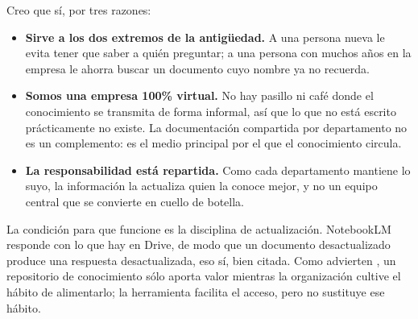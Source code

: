 \documentclass[11pt,letterpaper]{article}
\begin{document}
Creo que sí, por tres razones:

\begin{itemize}[leftmargin=1.2em, itemsep=0.25em]
  \item \textbf{Sirve a los dos extremos de la antigüedad.} A una persona nueva
    le evita tener que saber a quién preguntar; a una persona con muchos años
    en la empresa le ahorra buscar un documento cuyo nombre ya no recuerda.
  \item \textbf{Somos una empresa 100\% virtual.} No hay pasillo ni café donde
    el conocimiento se transmita de forma informal, así que lo que no está
    escrito prácticamente no existe. La documentación compartida por
    departamento no es un complemento: es el medio principal por el que el
    conocimiento circula.
  \item \textbf{La responsabilidad está repartida.} Como cada departamento
    mantiene lo suyo, la información la actualiza quien la conoce mejor, y no
    un equipo central que se convierte en cuello de botella.
\end{itemize}

La condición para que funcione es la disciplina de actualización. NotebookLM
responde con lo que hay en Drive, de modo que un documento desactualizado
produce una respuesta desactualizada, eso sí, bien citada. Como advierten
\textcite{davenport1998}, un repositorio de conocimiento sólo aporta valor
mientras la organización cultive el hábito de alimentarlo; la herramienta
facilita el acceso, pero no sustituye ese hábito.

\printbibliography[title={Referencias}]
\end{document}

